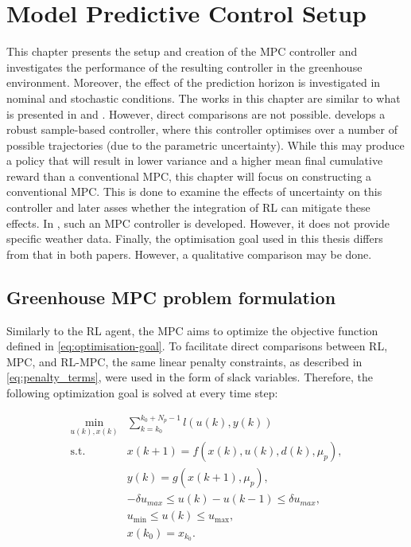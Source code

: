 \chapter{Model Predictive Control Setup}
\label{chapter:MPC}
This chapter presents the setup and creation of the MPC controller and investigates the performance of the resulting controller in the greenhouse environment. Moreover, the effect of the prediction horizon is investigated in nominal and stochastic conditions. The works in this chapter are similar to what is presented in \citet{boersmaRobustSamplebasedModel2022} and \citet{morcegoReinforcementLearningModel2023}. However, direct comparisons are not possible. \citet{boersmaRobustSamplebasedModel2022} develops a robust sample-based controller, where this controller optimises over a number of possible trajectories (due to the parametric uncertainty). While this may produce a policy that will result in lower variance and a higher mean final cumulative reward than a conventional MPC, this chapter will focus on constructing a conventional MPC. This is done to examine the effects of uncertainty on this controller and later asses whether the integration of RL can mitigate these effects. In \citet{morcegoReinforcementLearningModel2023}, such an MPC controller is developed. However, it does not provide specific weather data. Finally, the optimisation goal used in this thesis differs from that in both papers. However, a qualitative comparison may be done.



\section{Greenhouse MPC problem formulation}\label{section: greenhouse MPC formulation}
Similarly to the RL agent, the MPC aims to optimize the objective function defined in \autoref{eq:optimisation-goal}. To facilitate direct comparisons between RL, MPC, and RL-MPC, the same linear penalty constraints, as described in \autoref{eq:penalty_terms}, were used in the form of slack variables. Therefore, the following optimization goal is solved at every time step:

\begin{subequations} \label{eq:mpc_ocp}
	\begin{align}
		\min_{u(k),x(k)} & \sum_{k = k_0}^{k_0 + N_p-1} {l(u(k), y(k))} \\
		\text{s.t.} \quad & x(k+1) = f(x(k), u(k), d(k), \mu_p),  \label{eq:constraint-1} \\
		& y(k) = g(x(k+1), \mu_p), \label{eq:constraint-dynamics} \\
		& -\delta u_{max} \leq u(k) - u(k-1) \leq \delta u_{max}, \label{eq:constraint-delta-u} \\
		& u_{\min} \leq u(k) \leq u_{\max}, \label{eq:constraint-u-limits}\\
		& x(k_0) = x_{k_0}. \label{eq:constraint-initial}\\
	\end{align}
\end{subequations}

